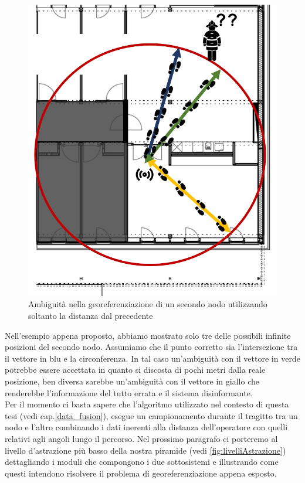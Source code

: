 \begin{figure}[H]
	\centering
	\includegraphics[scale=0.35]{DescrizioneDelSistema/ambiguitDistanza.png}
	\caption{Ambiguità nella georeferenziazione di un secondo nodo utilizzando soltanto la distanza dal precedente }
	\label{fig:ambiguitDistanz}
\end{figure}
Nell'esempio appena proposto, abbiamo mostrato solo tre delle possibili infinite posizioni del secondo nodo. Assumiamo che il punto corretto sia l'intersezione tra il vettore in blu e la circonferenza. In tal caso un'ambiguità con il vettore in verde potrebbe essere accettata in quanto si discosta di pochi metri dalla reale posizione, ben diversa sarebbe un'ambiguità con il vettore in giallo che renderebbe l'informazione del tutto errata e il sistema disinformante.\\
Per il momento ci basta sapere che l'algoritmo utilizzato nel contesto di questa tesi (vedi cap.\ref{data_fusion}), esegue un campionamento durante il tragitto tra un nodo e l'altro combinando i dati inerenti alla distanza dell'operatore con quelli relativi agli angoli lungo il percorso.
Nel prossimo paragrafo ci porteremo al livello d'astrazione più basso della nostra piramide (vedi \ref{fig:livelliAstrazione}) dettagliando i moduli che compongono i due sottosistemi e illustrando come questi intendono risolvere il problema di georeferenziazione appena esposto. \newpage


